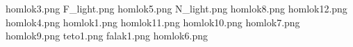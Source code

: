 homlok3.png
F_light.png
homlok5.png
N_light.png
homlok8.png
homlok12.png
homlok4.png
homlok1.png
homlok11.png
homlok10.png
homlok7.png
homlok9.png
teto1.png
falak1.png
homlok6.png
